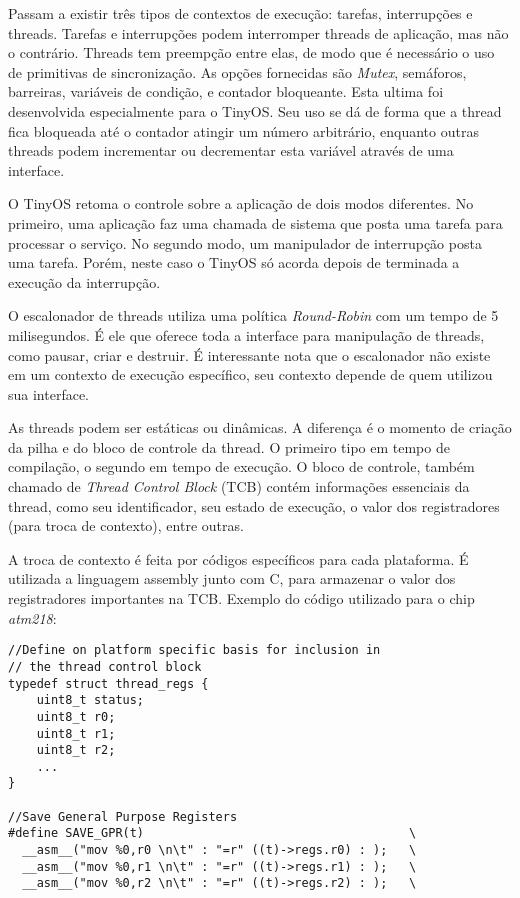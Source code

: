 \documentclass[a4paper,onecolumn, 10pt]{article}
\begin{document}
Passam a existir três tipos de contextos de execução: tarefas, interrupções e threads. Tarefas e interrupções podem
interromper threads de aplicação, mas não o contrário. Threads tem preempção entre elas, de modo que é necessário o uso de primitivas 
de sincronização. As opções fornecidas são \textit{Mutex}, semáforos, barreiras, variáveis de condição, e contador
bloqueante. Esta ultima foi desenvolvida especialmente para o TinyOS. Seu uso se dá de forma que a thread fica bloqueada
até o contador atingir um número arbitrário, enquanto outras threads podem incrementar ou decrementar esta variável
através de uma interface.

O TinyOS retoma o controle sobre a aplicação de dois modos diferentes. No primeiro, uma aplicação faz uma chamada de
sistema que posta uma tarefa para processar o serviço. No segundo modo, um manipulador de interrupção posta uma tarefa.
Porém, neste caso o TinyOS só acorda depois de terminada a execução da interrupção.

O escalonador de threads utiliza uma política \textit{Round-Robin} com um tempo de 5 milisegundos. É ele que oferece
toda a interface para manipulação de threads, como pausar, criar e destruir. É interessante nota que o escalonador não
existe em um contexto de execução específico, seu contexto depende de quem utilizou sua interface.

As threads podem ser estáticas ou dinâmicas. A diferença é o momento de criação da pilha e do bloco de controle da
thread. O primeiro tipo em tempo de compilação, o segundo em tempo de execução. O bloco de controle, também chamado de
\textit{Thread Control Block} (TCB) contém informações essenciais da thread, como seu identificador, seu estado de
execução, o valor dos registradores (para troca de contexto), entre outras.

A troca de contexto é feita por códigos específicos para cada plataforma. É utilizada a linguagem assembly junto com C,
para armazenar o valor dos registradores importantes na TCB. Exemplo do código utilizado para o chip \textit{atm218}:

\begin{lstlisting}
//Define on platform specific basis for inclusion in
// the thread control block
typedef struct thread_regs {
    uint8_t status;
    uint8_t r0;
    uint8_t r1;
    uint8_t r2;
    ...
}

//Save General Purpose Registers
#define SAVE_GPR(t)                                     \
  __asm__("mov %0,r0 \n\t" : "=r" ((t)->regs.r0) : );   \
  __asm__("mov %0,r1 \n\t" : "=r" ((t)->regs.r1) : );   \
  __asm__("mov %0,r2 \n\t" : "=r" ((t)->regs.r2) : );   \


\end{lstlisting}
\end{document}
